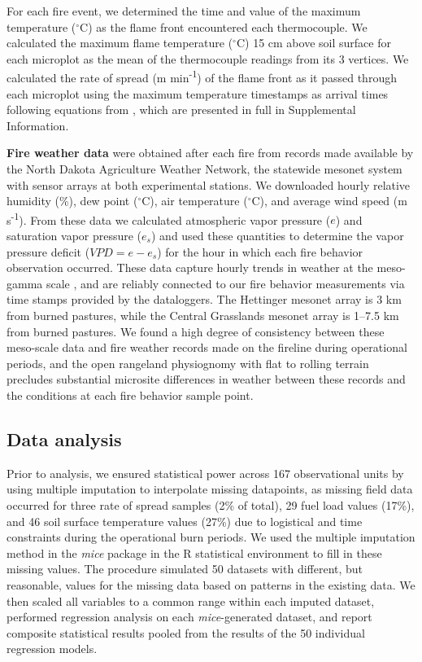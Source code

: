 \documentclass[referee, 
		     sn-basic]{sn-jnl}
\newcommand{\degC}{$^\circ$C}
\begin{document}
\begin{linenumbers}
For each fire event, we determined the time and value of the maximum temperature (\degC) as the flame front encountered each thermocouple. 
We calculated the maximum flame temperature (\degC) 15 cm above soil surface for each microplot as the mean of the thermocouple readings from its 3 vertices. 
We calculated the rate of spread (m min\textsuperscript{-1}) of the flame front as it passed through each microplot using the maximum temperature timestamps as arrival times following equations from \citet{simard1984}, which are presented in full in Supplemental Information.

\textbf{Fire weather data} were obtained after each fire from records
made available by the North Dakota Agriculture Weather Network, the
statewide mesonet system with sensor arrays at both experimental
stations. We downloaded hourly relative humidity (\%), dew point
(\degC), air temperature (\degC), and average wind speed (m s\textsuperscript{-1}). From these data we calculated atmospheric vapor pressure ($e$) and saturation vapor pressure ($e_s$) and used these
quantities to determine the vapor pressure deficit ($VPD = e - e_s$)
for the hour in which each fire behavior observation occurred. These
data capture hourly trends in weather at the meso-gamma scale \citep[2-20 km;][]{orlanski1975}, and are reliably connected to our fire behavior measurements via time stamps provided by the dataloggers. 
The Hettinger mesonet array is 3 km from burned pastures, while the Central Grasslands mesonet array is 1--7.5 km from burned pastures. 
We found a high degree of consistency between these meso-scale data and fire weather records made on the fireline during operational periods, and the open rangeland physiognomy with flat to rolling terrain precludes substantial microsite differences in weather between these records and the conditions at each fire behavior sample point.

\subsection{Data analysis}

Prior to analysis, we ensured statistical power across 167 observational
units by using multiple imputation to interpolate missing datapoints, as
missing field data occurred for three rate of spread samples (2\% of
total), 29 fuel load values (17\%), and 46 soil surface temperature
values (27\%) due to logistical and time constraints during the
operational burn periods. We used the multiple imputation method in the
\emph{mice} package \citep{vanbuuren2011} in the \textsf{R} statistical environment \citep{rct2020} to fill in these missing values. 
The procedure simulated 50 datasets with different, but reasonable, values for the missing data based on patterns in the existing data. 
We then scaled all variables to a common range within each imputed dataset, performed regression analysis on each \emph{mice}-generated dataset, and report composite statistical results pooled from the results of the 50 individual regression models.


\end{linenumbers}
\end{document}
